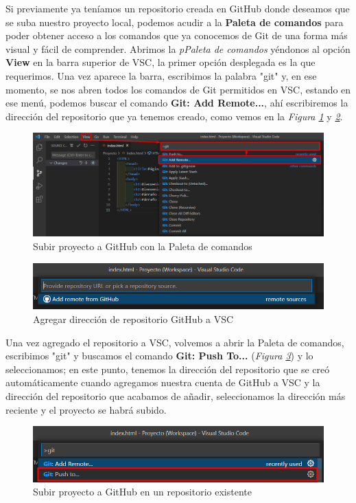 Si previamente ya teníamos un repositorio creada en GitHub donde deseamos que se suba nuestro proyecto local, podemos acudir a la \textbf{Paleta de comandos} para poder obtener acceso a los comandos que ya conocemos de Git de una forma más visual y fácil de comprender. Abrimos la \textit{pPaleta de comandos} yéndonos al opción \textbf{View} en la barra superior de VSC, la primer opción desplegada es la que requerimos. Una vez aparece la barra, escribimos la palabra "git" y, en ese momento, se nos abren todos los comandos de Git permitidos en VSC, estando en ese menú, podemos buscar el comando \textbf{Git: Add Remote...}, ahí escribiremos la dirección del repositorio que ya tenemos creado, como vemos en la \textit{Figura \ref{fig: 29}} y \textit{\ref{fig: 30}}.
\begin{figure}[H]
    \centering
    \caption{Subir proyecto a GitHub con la Paleta de comandos}
    \label{fig: 29}
    \includegraphics[width=13cm]{capturas/subir_proyecto3.png}
\end{figure}
\begin{figure}[H]
    \centering
    \caption{Agregar dirección de repositorio GitHub a VSC}
    \label{fig: 30}
    \includegraphics[width=13cm]{capturas/subir_proyecto4.png}
\end{figure}

Una vez agregado el repositorio a VSC, volvemos a abrir la Paleta de comandos, escribimos "git" y buscamos el comando \textbf{Git: Push To...} (\textit{Figura \ref{fig: 31}}) y lo seleccionamos; en este punto, tenemos la dirección del repositorio que se creó automáticamente cuando agregamos nuestra cuenta de GitHub a VSC y la dirección del repositorio que acabamos de añadir, seleccionamos la dirección más reciente y el proyecto se habrá subido.
\begin{figure}[H]
    \centering
    \caption{Subir proyecto a GitHub en un repositorio existente}
    \label{fig: 31}
    \includegraphics[width=13cm]{capturas/subir_proyecto5.png}
\end{figure}


